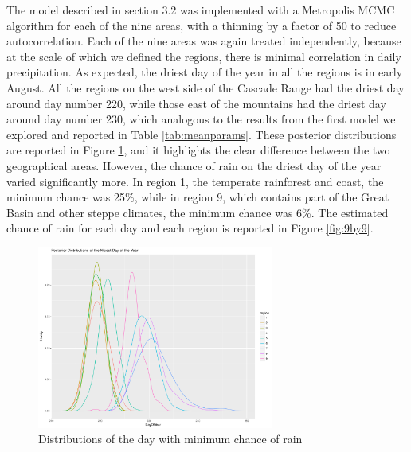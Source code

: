 \documentclass{article}
\begin{document}
The model described in section 3.2 was implemented with a Metropolis MCMC algorithm for each of the nine areas, with a thinning by a factor of 50 to reduce autocorrelation. Each of the nine areas was again treated independently, because at the scale of which we defined the regions, there is minimal correlation in daily precipitation.  As expected, the driest day of the year in all the regions is in early August. All the regions on the west side of the Cascade Range had the driest day around day number 220, while those east of the mountains had the driest day around day number 230, which analogous to the results from the first model we explored and reported in Table \ref{tab:meanparams}. These posterior distributions are reported in Figure \ref{fig:driestDist}, and it highlights the clear difference between the two geographical areas. However, the chance of rain on the driest day of the year varied significantly more. In region 1, the temperate rainforest and coast, the minimum chance was 25\%, while in region 9, which contains part of the Great Basin and other steppe climates, the minimum chance was 6\%. The estimated chance of rain for each day and each region is reported in Figure \ref{fig:9by9}.

\begin{figure}
\centering
\includegraphics[width = .4\textwidth, height = 6cm]{NicestDayOfYear}
\caption{Distributions of the day with minimum chance of rain}
\label{fig:driestDist}
\end{figure}
\end{document}
